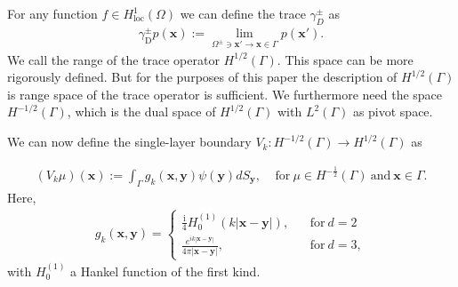 For any function $f\in H_{\text{loc}}^1(\Omega)$ we can define the trace $\gamma_{D}^{\pm}$ as
\begin{align*}
    \gamma_{\text{D}}^{\pm}p(\boldsymbol{x}):=\lim_{\Omega^{\pm}\ni\boldsymbol{x'}\rightarrow\boldsymbol{x}\in\Gamma}p(\boldsymbol{x'}).
\end{align*}
We call the range of the trace operator $H^{1/2}(\Gamma)$. This space can be more rigorously defined. But for the purposes of this paper the description of $H^{1/2}(\Gamma)$ is range space of the trace operator is sufficient. We furthermore need the space $H^{-1/2}(\Gamma)$, which is the dual space of $H^{1/2}(\Gamma)$ with $L^2(\Gamma)$ as pivot space.

We can now define the single-layer boundary $V_{k}:H^{-1/2}(\Gamma)\rightarrow H^{1/2}(\Gamma)$ as

\begin{align*}
    (V_{k}\mu)(\boldsymbol{x}) := \int_{\Gamma}g_{k}(\boldsymbol{x},\boldsymbol{y})\psi(\boldsymbol{y})dS_{\boldsymbol{y}}, \ \ \ \ \ 
    \text{for}\ \mu\in H^{-\frac{1}{2}}(\Gamma) \  \text{and} \ \boldsymbol{x}\in\Gamma.
\end{align*}
Here, 
\begin{align}\label{Green's function}
    g_{k}(\boldsymbol{x},\boldsymbol{y}) = \begin{cases}
          \frac{\mathrm{i}}{4}H_{0}^{(1)}(k|\boldsymbol{x}-\boldsymbol{y}|), \ \ \ \ &\text{for} \ d = 2\\
          \frac{e^{ik|\boldsymbol{x}-\boldsymbol{y}|}}{4\pi|\boldsymbol{x} - \boldsymbol{y}|}, \ \ \ \ &\text{for} \ d = 3,
        \end{cases}
\end{align}
with $H_{0}^{(1)}$  a Hankel function of the first kind.



